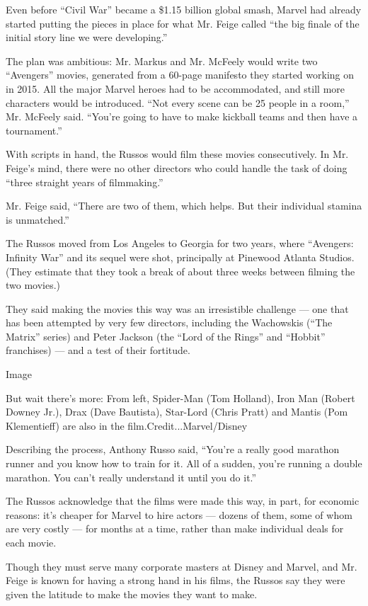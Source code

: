 Even before ``Civil War'' became a \$1.15 billion global smash, Marvel
had already started putting the pieces in place for what Mr. Feige
called ``the big finale of the initial story line we were developing.''

The plan was ambitious: Mr. Markus and Mr. McFeely would write two
``Avengers'' movies, generated from a 60-page manifesto they started
working on in 2015. All the major Marvel heroes had to be accommodated,
and still more characters would be introduced. ``Not every scene can be
25 people in a room,'' Mr. McFeely said. ``You're going to have to make
kickball teams and then have a tournament.''

With scripts in hand, the Russos would film these movies consecutively.
In Mr. Feige's mind, there were no other directors who could handle the
task of doing ``three straight years of filmmaking.''

Mr. Feige said, ``There are two of them, which helps. But their
individual stamina is unmatched.''

The Russos moved from Los Angeles to Georgia for two years, where
``Avengers: Infinity War'' and its sequel were shot, principally at
Pinewood Atlanta Studios. (They estimate that they took a break of about
three weeks between filming the two movies.)

They said making the movies this way was an irresistible challenge ---
one that has been attempted by very few directors, including the
Wachowskis (``The Matrix'' series) and Peter Jackson (the ``Lord of the
Rings'' and ``Hobbit'' franchises) --- and a test of their fortitude.

Image

But wait there's more: From left, Spider-Man (Tom Holland), Iron Man
(Robert Downey Jr.), Drax (Dave Bautista), Star-Lord (Chris Pratt) and
Mantis (Pom Klementieff) are also in the film.Credit...Marvel/Disney

Describing the process, Anthony Russo said, ``You're a really good
marathon runner and you know how to train for it. All of a sudden,
you're running a double marathon. You can't really understand it until
you do it.''

The Russos acknowledge that the films were made this way, in part, for
economic reasons: it's cheaper for Marvel to hire actors --- dozens of
them, some of whom are very costly --- for months at a time, rather than
make individual deals for each movie.

Though they must serve many corporate masters at Disney and Marvel, and
Mr. Feige is known for having a strong hand in his films, the Russos say
they were given the latitude to make the movies they want to make.

